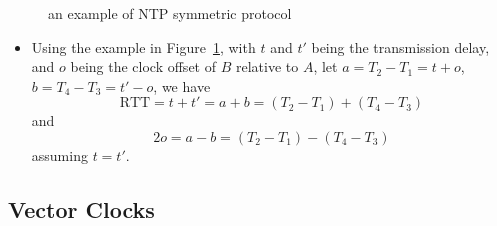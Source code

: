 \documentclass[twocolumn,landscape,10pt]{article}
\theoremstyle{definition}
\begin{document}
\begin{itemize}
\begin{itemize}
\begin{figure}[h]
                  	\centering
                  	\caption{an example of NTP symmetric protocol}\label{fig:sym}
                \end{figure}
                \begin{itemize}
                    \item Using the example in Figure~\ref{fig:sym}, with $t$
                        and $t'$ being the transmission delay, and $o$ being the
                        clock offset of $B$ relative to $A$,
                        let $a=T_2-T_1=t+o$, $b=T_4-T_3=t'-o$, we have
                        \[
                            \text{RTT} = t + t' = a + b = (T_2-T_1)+(T_4-T_3)
                        \]
                        and 
                        \[
                            2o=a-b=(T_2-T_1)-(T_4-T_3)
                        \]
                        assuming $t=t'$.
                \end{itemize} 
        \end{itemize} 
\end{itemize} 

\subsection{Vector Clocks}
\end{document}

